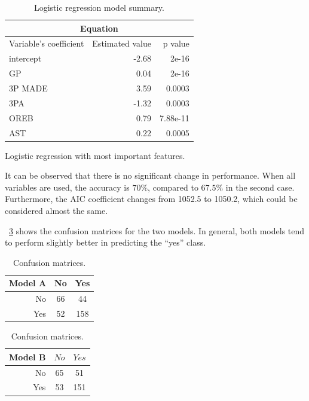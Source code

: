 \begin{table}[H]
	\hfill
	\begin{subtable}[h]{0.3\textwidth}
		\centering
		\begin{tabular}{|| l | r | r ||} 
			\hline
			\multicolumn{3}{|c|}{Equation} \\
			\hline
			Variable's coefficient & Estimated value & p value \\
			\hline
			intercept & -2.68 & 2e-16 \\
			GP & 0.04 & 2e-16 \\
			3P MADE & 3.59 & 0.0003 \\
			3PA & -1.32 & 0.0003 \\
			OREB & 0.79 & 7.88e-11 \\		
			AST & 0.22 & 0.0005 \\
			\hline
		\end{tabular}
		\caption{Logistic regression with most important features.}
		\label{table:LRImpSum}
	\end{subtable}
	\caption{Logistic regression model summary.}
	\label{table:LRSum}
\end{table}

It can be observed that there is no significant change in performance. When all variables are used, the accuracy is $70\%$, compared to $67.5\%$ in the second case. Furthermore, the AIC coefficient changes from 1052.5 to 1050.2, which could be considered almost the same. 

\Tab~\ref{table:ConfMat} shows the confusion matrices for the two models. In general, both models tend to perform slightly better in predicting the ``yes'' class.

\begin{table}[H]
	\begin{subtable}[h]{0.4\textwidth}
		\centering
		\begin{tabular}{|| cr | cc ||}    
			\hline
			\multicolumn{2}{|c|}{Model A} 
			& No & Yes \\
			\hline
			& No & 66 & 44 \\
			& Yes & 52 & 158 \\
			\hline
		\end{tabular}
		\caption{}
		\label{table:ConfMatModA}
	\end{subtable}
	\hfill
	\begin{subtable}[h]{0.4\textwidth}
		\centering
		\begin{tabular}{|| cr | cc ||}    
			\hline
			\multicolumn{2}{|c|}{Model B} 
			& $No$ & $Yes$ \\
			\hline
			& No & 65 & 51 \\
			& Yes & 53 & 151 \\
			\hline
		\end{tabular}
		\caption{}
		\label{table:ConfMatModA}
	\end{subtable}
	\caption{Confusion matrices.}
	\label{table:ConfMat}
\end{table}

